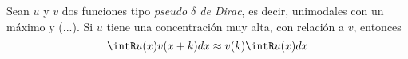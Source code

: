 
\begin{proposicion}
Sean $u$ y $v$ dos funciones tipo \textit{pseudo $\delta$ de Dirac}, es decir, unimodales con un
máximo  y (...). Si $u$ tiene una concentración muy alta, con relación a $v$, entonces
\begin{equation*}
\intR u(x) v(x+k) dx \approx v(k) \intR u(x) dx
\end{equation*}
\label{pseudo_d}
\end{proposicion}


%

